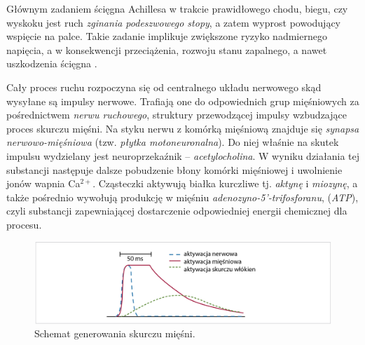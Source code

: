 Głównym zadaniem ścięgna Achillesa w trakcie prawidłowego chodu, biegu, czy wyskoku jest ruch \textit{zginania podeszwowego stopy}, a zatem wyprost powodujący wspięcie na palce. Takie zadanie implikuje zwiększone ryzyko nadmiernego napięcia, \linebreak a w konsekwencji przeciążenia, rozwoju stanu zapalnego, a nawet uszkodzenia ścięgna \cite{Etiologia}.

Cały proces ruchu rozpoczyna się od centralnego układu nerwowego skąd wysyłane są impulsy nerwowe. Trafiają one do odpowiednich grup mięśniowych za pośrednictwem \textit{nerwu ruchowego}, struktury  przewodzącej impulsy wzbudzające proces skurczu mięśni. Na styku nerwu z komórką mięśniową znajduje się \textit{synapsa nerwowo-mięśniowa} (tzw. \textit{płytka motoneuronalna}). Do niej właśnie na skutek impulsu wydzielany jest neuroprzekaźnik -- \textit{acetylocholina}. W wyniku działania tej substancji następuje dalsze pobudzenie błony komórki mięśniowej i uwolnienie jonów wapnia Ca$^{2+}$. Cząsteczki aktywują białka kurczliwe tj. \textit{aktynę} i \textit{miozynę}, a także pośrednio wywołują produkcję w mięśniu \textit{adenozyno-5'-trifosforanu}, (\textit{ATP}), czyli substancji zapewniającej dostarczenie odpowiedniej energii chemicznej dla procesu.
\begin{figure}[h!]
	\centering
	\includegraphics[width=1\textwidth]{figures/skurcz_miesni.png}
	\caption{Schemat generowania skurczu mięśni.}
	\label{muscle-excitements}
\end{figure}

